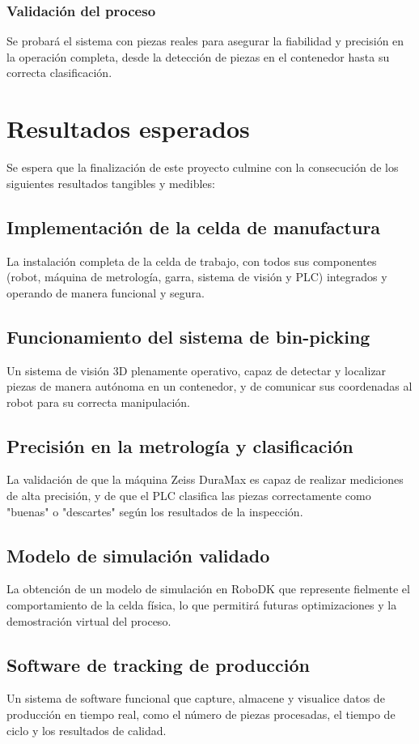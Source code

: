 \documentclass[12pt, a4paper]{article}
\begin{document}
\subsubsection{Validación del proceso}
Se probará el sistema con piezas reales para asegurar la fiabilidad y precisión en la operación completa, desde la detección de piezas en el contenedor hasta su correcta clasificación.

\section{Resultados esperados}
Se espera que la finalización de este proyecto culmine con la consecución de los siguientes resultados tangibles y medibles:

\subsection{Implementación de la celda de manufactura}
La instalación completa de la celda de trabajo, con todos sus componentes (robot, máquina de metrología, garra, sistema de visión y PLC) integrados y operando de manera funcional y segura.

\subsection{Funcionamiento del sistema de bin-picking}
Un sistema de visión 3D plenamente operativo, capaz de detectar y localizar piezas de manera autónoma en un contenedor, y de comunicar sus coordenadas al robot para su correcta manipulación.

\subsection{Precisión en la metrología y clasificación}
La validación de que la máquina Zeiss DuraMax es capaz de realizar mediciones de alta precisión, y de que el PLC clasifica las piezas correctamente como "buenas" o "descartes" según los resultados de la inspección.

\subsection{Modelo de simulación validado}
La obtención de un modelo de simulación en RoboDK que represente fielmente el comportamiento de la celda física, lo que permitirá futuras optimizaciones y la demostración virtual del proceso.

\subsection{Software de tracking de producción}
Un sistema de software funcional que capture, almacene y visualice datos de producción en tiempo real, como el número de piezas procesadas, el tiempo de ciclo y los resultados de calidad.
\end{document}
